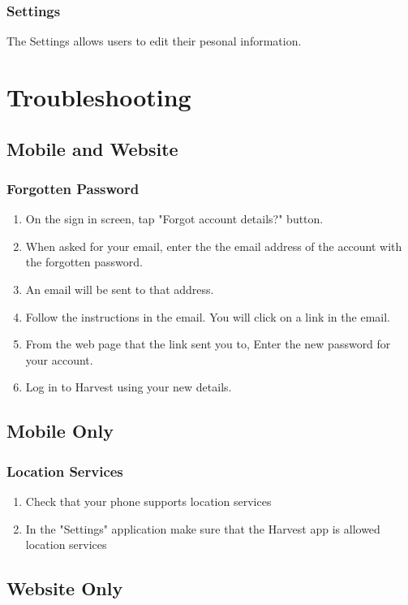 \documentclass[11pt]{article}
\begin{document}
\subsubsection{Settings}
\label{webSettings}

The Settings allows users to edit their pesonal information.

\newpage
\section{Troubleshooting}

\subsection{Mobile and Website}

\subsubsection{Forgotten Password}
\begin{enumerate}
\item On the sign in screen, tap "Forgot account details?" button.
\item When asked for your email, enter the the email address of the account with the forgotten password.
\item An email will be sent to that address.
\item Follow the instructions in the email. You will click on a link in the email.
\item From the web page that the link sent you to, Enter the new password for your account.
\item Log in to Harvest using your new details.
\end{enumerate}

\subsection{Mobile Only}
\subsubsection{Location Services}
\begin{enumerate}
\item Check that your phone supports location services
\item In the "Settings" application make sure that the Harvest app is allowed location services
\end{enumerate}

\subsection{Website Only}
\end{document}
